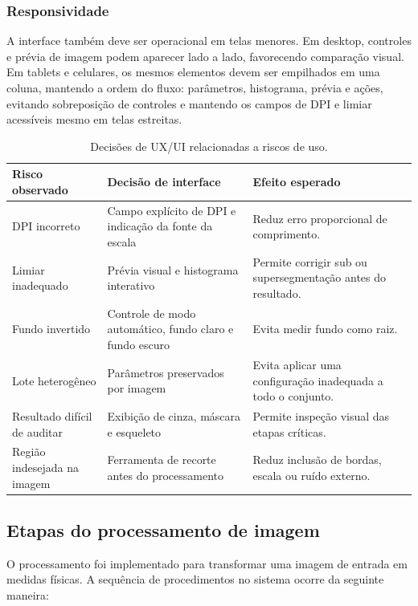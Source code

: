 \documentclass[12pt]{article}
\begin{document}
\subsubsection{Responsividade}

A interface também deve ser operacional em telas menores. Em desktop, controles e prévia de imagem podem aparecer lado a lado, favorecendo comparação visual. Em tablets e celulares, os mesmos elementos devem ser empilhados em uma coluna, mantendo a ordem do fluxo: parâmetros, histograma, prévia e ações, evitando sobreposição de controles e mantendo os campos de DPI e limiar acessíveis mesmo em telas estreitas.

\begin{table}[!htbp]
\centering
\caption{Decisões de UX/UI relacionadas a riscos de uso.}
\label{tab:ux}
\begin{tabular}{p{4.2cm}p{4.8cm}p{4.8cm}}
\toprule
Risco observado & Decisão de interface & Efeito esperado \\
\midrule
DPI incorreto & Campo explícito de DPI e indicação da fonte da escala & Reduz erro proporcional de comprimento. \\
Limiar inadequado & Prévia visual e histograma interativo & Permite corrigir sub ou supersegmentação antes do resultado. \\
Fundo invertido & Controle de modo automático, fundo claro e fundo escuro & Evita medir fundo como raiz. \\
Lote heterogêneo & Parâmetros preservados por imagem & Evita aplicar uma configuração inadequada a todo o conjunto. \\
Resultado difícil de auditar & Exibição de cinza, máscara e esqueleto & Permite inspeção visual das etapas críticas. \\
Região indesejada na imagem & Ferramenta de recorte antes do processamento & Reduz inclusão de bordas, escala ou ruído externo. \\
\bottomrule
\end{tabular}
\end{table}

\vspace{5mm}

\subsection{Etapas do processamento de imagem}
\label{sec:etapas}

O processamento foi implementado para transformar uma imagem de entrada em medidas físicas. A sequência de procedimentos no sistema ocorre da seguinte maneira:
\end{document}
